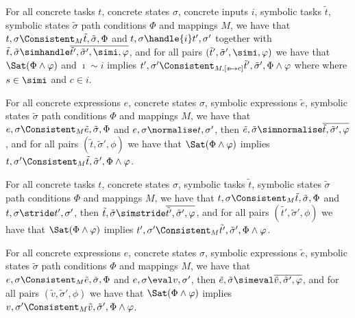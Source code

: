 \begin{lemma}
  \label{lem:completeHandle}
  For all concrete tasks $t$, concrete states $\sigma$, concrete inputs $i$, symbolic tasks $\tilde{t}$, symbolic states $\tilde{\sigma}$ path conditions $\Phi$ and mappings $M$,
  we have that $t,\sigma\Consistent_{M}\tilde{t},\tilde{\sigma},\Phi$ and
  $t,\sigma\handle{i}t',\sigma'$ together with
  $\tilde{t},\tilde{\sigma}\simhandle\overline{\tilde{t}',\tilde{\sigma}',\simi,\phi}$,
  and for all pairs $(\tilde{t}',\tilde{\sigma}',\simi,\phi)$ we have that $\Sat(\Phi\land\phi)$ and $\imath\sim i$ implies $t',\sigma'\Consistent_{M.[s\mapsto c]}\tilde{t}',\tilde{\sigma}',\Phi\land\phi$ where where $s\in\simi$ and $c\in i$.
\end{lemma}

\begin{lemma}
  \label{lem:completeNormalise}
  For all concrete expressions $e$, concrete states $\sigma$, symbolic expressions $\tilde{e}$, symbolic states $\tilde{\sigma}$ path conditions $\Phi$ and mappings $M$,
  we have that $e,\sigma\Consistent_{M}\tilde{e},\tilde{\sigma},\Phi$
  and $e,\sigma\normalise t,\sigma'$,
  then $\tilde{e},\tilde{\sigma}\simnormalise\overline{\tilde{t},\tilde{\sigma}',\phi}$,
  and for all pairs $(\tilde{t},\tilde{\sigma}',\phi)$ we have that $\Sat(\Phi\land\phi)$ implies $t,\sigma'\Consistent_{M}\tilde{t},\tilde{\sigma}',\Phi\land\phi$.
\end{lemma}

\begin{lemma}
  \label{lem:completeStride}
  For all concrete tasks $t$, concrete states $\sigma$, symbolic tasks $\tilde{t}$, symbolic states $\tilde{\sigma}$ path conditions $\Phi$ and mappings $M$,
  we have that $t,\sigma\Consistent_{M}\tilde{t},\tilde{\sigma},\Phi$
  and $t,\sigma\stride t',\sigma'$,
  then $\tilde{t},\tilde{\sigma}\simstride\overline{\tilde{t'},\tilde{\sigma}',\phi}$,
  and for all pairs $(\tilde{t'},\tilde{\sigma}',\phi)$ we have that $\Sat(\Phi\land\phi)$ implies $t',\sigma'\Consistent_{M}\tilde{t'},\tilde{\sigma}',\Phi\land\phi$.
\end{lemma}

\begin{lemma}
  \label{lem:completeEval}
  For all concrete expressions $e$, concrete states $\sigma$, symbolic expressions $\tilde{e}$, symbolic states $\tilde{\sigma}$ path conditions $\Phi$ and mappings $M$,
  we have that $e,\sigma\Consistent_{M}\tilde{e},\tilde{\sigma},\Phi$
  and $e,\sigma\eval v,\sigma'$,
  then $\tilde{e},\tilde{\sigma}\simeval\overline{\tilde{v},\tilde{\sigma}',\phi}$,
  and for all pairs $(\tilde{v},\tilde{\sigma}',\phi)$ we have that $\Sat(\Phi\land\phi)$ implies $v,\sigma'\Consistent_{M}\tilde{v},\tilde{\sigma}',\Phi\land\phi$.
\end{lemma}

